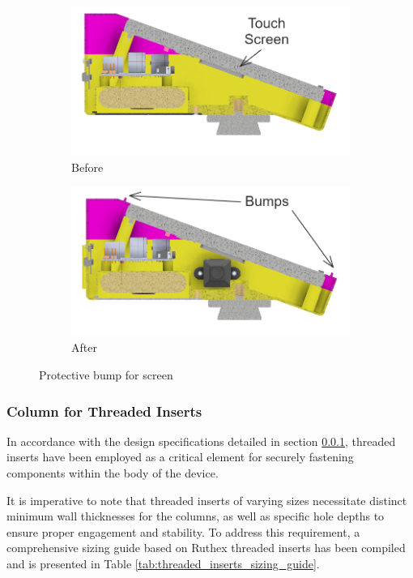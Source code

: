 \begin{figure}[h!]
    \centering
    \begin{subfigure}[c]{0.47\textwidth}
        \begin{minipage}{\textwidth}
            \centering
            \includegraphics[height=3.5 cm]{texs/Part1/chapter4/image/d21.png}
        \end{minipage}
        \caption{Before}
        \label{fig:detail_screen_before}
    \end{subfigure}
    \begin{subfigure}[c]{0.47\textwidth}
        \begin{minipage}{\textwidth}
            \centering
            \includegraphics[height=3.5 cm]{texs/Part1/chapter4/image/d22.png}
        \end{minipage}
        \caption{After}
        \label{fig:detail_screen_after}
    \end{subfigure}
    \caption{Protective bump for screen}
    \label{fig:detail_screen_protect}
\end{figure}

\subsubsection{Column for Threaded Inserts}
In accordance with the design specifications detailed in section \ref{}, threaded inserts have been employed as a critical element for securely fastening components within the body of the device.

It is imperative to note that threaded inserts of varying sizes necessitate distinct minimum wall thicknesses for the columns, as well as specific hole depths to ensure proper engagement and stability. To address this requirement, a comprehensive sizing guide based on Ruthex threaded inserts has been compiled and is presented in Table \ref{tab:threaded_inserts_sizing_guide}.

